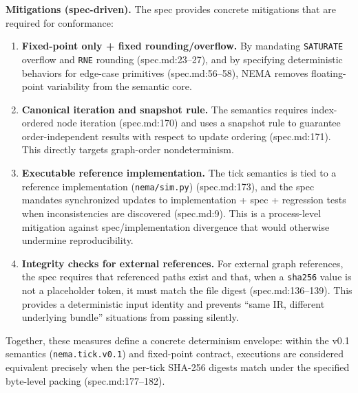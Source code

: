 \textbf{Mitigations (spec-driven).} The spec provides concrete mitigations that are required for conformance:
\begin{enumerate}
\item \textbf{Fixed-point only + fixed rounding/overflow.} By mandating \texttt{SATURATE} overflow and \texttt{RNE} rounding (spec.md:23--27), and by specifying deterministic behaviors for edge-case primitives (spec.md:56--58), NEMA removes floating-point variability from the semantic core.
\item \textbf{Canonical iteration and snapshot rule.} The semantics requires index-ordered node iteration (spec.md:170) and uses a snapshot rule to guarantee order-independent results with respect to update ordering (spec.md:171). This directly targets graph-order nondeterminism.
\item \textbf{Executable reference implementation.} The tick semantics is tied to a reference implementation (\texttt{nema/sim.py}) (spec.md:173), and the spec mandates synchronized updates to implementation + spec + regression tests when inconsistencies are discovered (spec.md:9). This is a process-level mitigation against spec/implementation divergence that would otherwise undermine reproducibility.
\item \textbf{Integrity checks for external references.} For external graph references, the spec requires that referenced paths exist and that, when a \texttt{sha256} value is not a placeholder token, it must match the file digest (spec.md:136--139). This provides a deterministic input identity and prevents ``same IR, different underlying bundle'' situations from passing silently.
\end{enumerate}

Together, these measures define a concrete determinism envelope: within the v0.1 semantics (\texttt{nema.tick.v0.1}) and fixed-point contract, executions are considered equivalent precisely when the per-tick SHA-256 digests match under the specified byte-level packing (spec.md:177--182).
